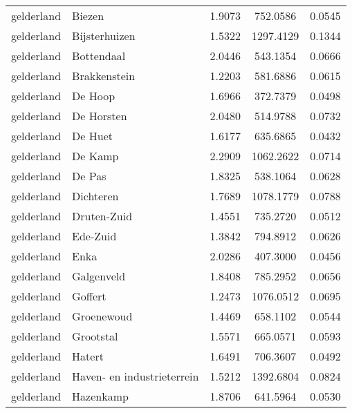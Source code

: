 \begin{longtable}{llccc}
	gelderland    & Biezen                           & 1.9073  & 752.0586  & 0.0545          \\
	gelderland    & Bijsterhuizen                    & 1.5322  & 1297.4129 & 0.1344          \\
	gelderland    & Bottendaal                       & 2.0446  & 543.1354  & 0.0666          \\
	gelderland    & Brakkenstein                     & 1.2203  & 581.6886  & 0.0615          \\
	gelderland    & De Hoop                          & 1.6966  & 372.7379  & 0.0498          \\
	gelderland    & De Horsten                       & 2.0480  & 514.9788  & 0.0732          \\
	gelderland    & De Huet                          & 1.6177  & 635.6865  & 0.0432          \\
	gelderland    & De Kamp                          & 2.2909  & 1062.2622 & 0.0714          \\
	gelderland    & De Pas                           & 1.8325  & 538.1064  & 0.0628          \\
	gelderland    & Dichteren                        & 1.7689  & 1078.1779 & 0.0788          \\
	gelderland    & Druten-Zuid                      & 1.4551  & 735.2720  & 0.0512          \\
	gelderland    & Ede-Zuid                         & 1.3842  & 794.8912  & 0.0626          \\
	gelderland    & Enka                             & 2.0286  & 407.3000  & 0.0456          \\
	gelderland    & Galgenveld                       & 1.8408  & 785.2952  & 0.0656          \\
	gelderland    & Goffert                          & 1.2473  & 1076.0512 & 0.0695          \\
	gelderland    & Groenewoud                       & 1.4469  & 658.1102  & 0.0544          \\
	gelderland    & Grootstal                        & 1.5571  & 665.0571  & 0.0593          \\
	gelderland    & Hatert                           & 1.6491  & 706.3607  & 0.0492          \\
	gelderland    & Haven- en industrieterrein       & 1.5212  & 1392.6804 & 0.0824          \\
	gelderland    & Hazenkamp                        & 1.8706  & 641.5964  & 0.0530          \\

\end{longtable}
